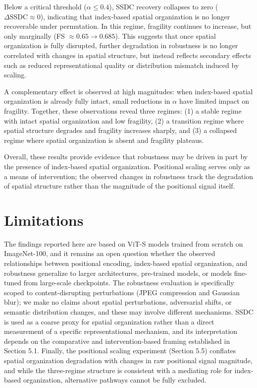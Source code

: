 \documentclass{article}
\begin{document}
    Below a critical threshold ($\alpha \leq 0.4$), SSDC recovery collapses to zero ($\Delta \mathrm{SSDC} \approx 0$), indicating that index-based spatial organization is no longer recoverable under permutation. In this regime, fragility continues to increase, but only marginally (FS $\approx 0.65 \rightarrow 0.685$). This suggests that once spatial organization is fully disrupted, further degradation in robustness is no longer correlated with changes in spatial structure, but instead reflects secondary effects such as reduced representational quality or distribution mismatch induced by scaling.

    A complementary effect is observed at high magnitudes: when index-based spatial organization is already fully intact, small reductions in $\alpha$ have limited impact on fragility. Together, these observations reveal three regimes: (1) a stable regime with intact spatial organization and low fragility, (2) a transition regime where spatial structure degrades and fragility increases sharply, and (3) a collapsed regime where spatial organization is absent and fragility plateaus.

    Overall, these results provide evidence that robustness may be driven in part by the presence of index-based spatial organization. Positional scaling serves only as a means of intervention; the observed changes in robustness track the degradation of spatial structure rather than the magnitude of the positional signal itself.


\section{Limitations}

The findings reported here are based on ViT-S models trained from scratch on ImageNet-100, and it remains an open question whether the observed relationships between positional encoding, index-based spatial organization, and robustness generalize to larger architectures, pre-trained models, or models fine-tuned from large-scale checkpoints. The robustness evaluation is specifically scoped to content-disrupting perturbations (JPEG compression and Gaussian blur); we make no claims about spatial perturbations, adversarial shifts, or semantic distribution changes, and these may involve different mechanisms. SSDC is used as a coarse proxy for spatial organization rather than a direct measurement of a specific representational mechanism, and its interpretation depends on the comparative and intervention-based framing established in Section 5.1. Finally, the positional scaling experiment (Section 5.5) conflates spatial organization degradation with changes in raw positional signal magnitude, and while the three-regime structure is consistent with a mediating role for index-based organization, alternative pathways cannot be fully excluded.
\end{document}
